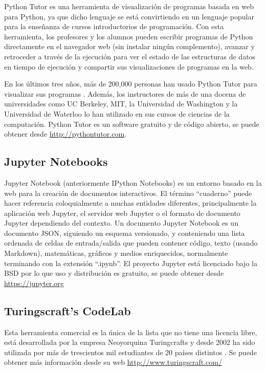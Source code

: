 Python Tutor es una herramienta de visualización de programas basada en web para Python, ya que dicho lenguaje se está convirtiendo en un lenguaje popular para la enseñanza de cursos introductorios de programación. Con esta herramienta, los profesores y los alumnos pueden escribir programas de Python directamente en el navegador web (sin instalar ningún complemento), avanzar y retroceder a través de la ejecución para ver el estado de las estructuras de datos en tiempo de ejecución y compartir sus visualizaciones de programas en la web.

En los últimos tres años, más de 200,000 personas han usado Python Tutor para visualizar sus programas \cite{GuoSIGCSE2013}. Además, los instructores de más de una docena de universidades como UC Berkeley, MIT, la Universidad de Washington y la Universidad de Waterloo lo han utilizado en sus cursos de ciencias de la computación. Python Tutor es un software gratuito y de código abierto, se puede obtener desde \url{http://pythontutor.com}.


\subsection {Jupyter Notebooks}

Jupyter Notebook (anteriormente IPython Notebooks) es un entorno basado en la web para la creación de documentos interactivos. El término ``cuaderno'' puede hacer referencia coloquialmente a muchas entidades diferentes, principalmente la aplicación web Jupyter, el servidor web Jupyter o el formato de documento Jupyter dependiendo del contexto. Un documento Jupyter Notebook es un documento JSON, siguiendo un esquema versionado, y conteniendo una lista ordenada de celdas de entrada/salida que pueden contener código, texto (usando Markdown), matemáticas, gráficos y medios enriquecidos, normalmente terminando con la extensión ``.ipynb''. El proyecto Jupyter está licenciado bajo la BSD por lo que uso y distribución es gratuito, se puede obtener desde \url{https://jupyter.org}

\subsection {Turingscraft's CodeLab}

Esta herramienta comercial es la única de la lista que no tiene una licencia libre, está desarrollada por la empresa Neoyorquina Turingcrafts y desde 2002 ha sido utilizada por más de trescientos mil estudiantes de 20 países distintos \cite{barr_using_2016}. Se puede obtener más información desde su web \url{http://www.turingscraft.com/}


